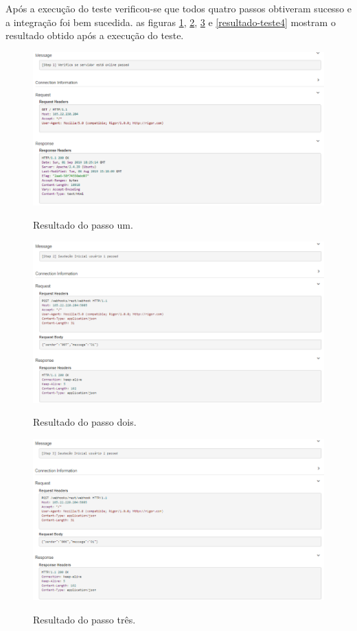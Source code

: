 Após a execução do teste verificou-se que todos quatro passos obtiveram sucesso e a integração foi bem sucedida. as figuras \ref{resultado-teste1}, \ref{resultado-teste2}, \ref{resultado-teste3} e \ref{resultado-teste4} mostram o resultado obtido após a execução do teste.

\begin{figure}[H]
  \centering
   \caption{Resultado do passo um.}
  \includegraphics[scale=0.5]{Imagens/resultado1.PNG} 
  \label{resultado-teste1}
\end{figure}


\begin{figure}[H]
  \centering
   \caption{Resultado do passo dois.}
  \includegraphics[scale=0.5]{Imagens/resultado2.PNG} 
  \label{resultado-teste2}
\end{figure}


\begin{figure}[H]
  \centering
   \caption{Resultado do passo três.}
  \includegraphics[scale=0.5]{Imagens/resutado3.PNG} 
  \label{resultado-teste3}
\end{figure}


